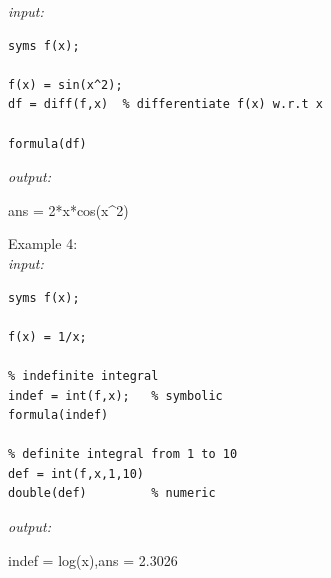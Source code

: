 \documentclass[../MATLAB_Primer.tex]{subfiles}
\begin{document}
\textit{input:}
\begin{lstlisting}
syms f(x);

f(x) = sin(x^2);
df = diff(f,x)  % differentiate f(x) w.r.t x

formula(df)

\end{lstlisting}
\textit{output:}
\begin{center}
    ans = 2*x*cos(x\^{}2)
\end{center}


Example 4:\\

\textit{input:}
\begin{lstlisting}
syms f(x);

f(x) = 1/x;

% indefinite integral
indef = int(f,x);   % symbolic 
formula(indef)

% definite integral from 1 to 10
def = int(f,x,1,10)
double(def)         % numeric 

\end{lstlisting}
\textit{output:}
\begin{center}
    indef = log(x),\quad ans = 2.3026
\end{center}
\end{document}
